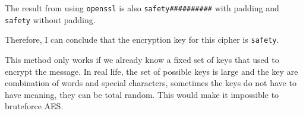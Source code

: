 \documentclass{article}
\begin{document}
The result from using \texttt{openssl} is also \texttt{safety\#\#\#\#\#\#\#\#\#\#}
with padding and \texttt{safety} without padding.

Therefore, I can conclude that the encryption key for this cipher is \texttt{safety}.

This method only works if we already know a fixed set of keys that used to
encrypt the message. In real life, the set of possible keys is large and the
key are combination of words and special characters, sometimes the keys do not
have to have meaning, they can be total random. This would make it impossible
to bruteforce AES.
\end{document}
